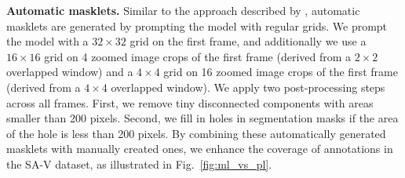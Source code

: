 \documentclass[]{fairmeta}
\newcommand{\figref}[1]{Fig.~\ref{#1}}
\begin{document}
\textbf{Automatic masklets.} Similar to the approach described by \cite{kirillov2023segment}, automatic masklets are generated by prompting the model with regular grids. We prompt the model with a $32\times 32$ grid on the first frame, and additionally we use a $16\times 16$ grid on 4 zoomed image crops of the first frame (derived from a $2\times 2$ overlapped window) and a $4\times 4$ grid on 16 zoomed image crops of the first frame (derived from a $4\times 4$ overlapped window). We apply two post-processing steps across all frames. First, we remove tiny disconnected components with areas smaller than 200 pixels. Second, we fill in holes in segmentation masks if the area of the hole is less than 200 pixels. By combining these automatically generated masklets with manually created ones, we enhance the coverage of annotations in the SA-V dataset, as illustrated in \figref{fig:ml_vs_pl}. %
\end{document}

